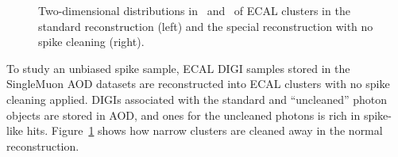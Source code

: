 \begin{figure}[htbp]
  \centering
  \caption{
    Two-dimensional distributions in \sipip\ and \sieie\ of ECAL clusters in the standard reconstruction (left) and the special reconstruction with no spike cleaning (right).
  }
  \label{fig:showershape_map}
\end{figure}

To study an unbiased spike sample, ECAL DIGI samples stored in the SingleMuon AOD datasets are reconstructed into ECAL clusters with no spike cleaning applied. 
DIGIs associated with the standard and ``uncleaned'' photon objects are stored in AOD, and ones for the uncleaned photons is rich in spike-like hits. 
Figure~\ref{fig:showershape_map} shows how narrow clusters are cleaned away in the normal reconstruction.

